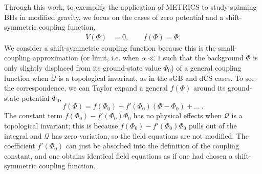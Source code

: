 \documentclass[aps,prx,amsmath,floats,floatfix,twocolumn,
  superscriptaddress,nofootinbib,showpacs]{revtex4-1}
\begin{document}
Through this work, to exemplify the application of METRICS to study spinning BHs in modified gravity, we focus on the cases of zero potential and a shift-symmetric coupling function, 
\begin{equation}\label{eq:shift-symmetric}
\begin{split}
V(\Phi) &= 0, \qquad
f(\Phi) = \Phi. 
\end{split}
\end{equation}
We consider a shift-symmetric coupling function because this is the small-coupling approximation (or limit, i.e. when $\alpha \ll 1 $ such that the background $\Phi$ is only slightly displaced from its ground-state value $\Phi_0$) of a general coupling function when $\mathscr{Q}$ is a topological invariant, as in the sGB and dCS cases.  
To see the correspondence, we can Taylor expand a general $f(\Phi)$ around its ground-state potential $\Phi_0$,
\begin{equation}
f(\Phi) = f(\Phi_0) + f'(\Phi_0) (\Phi - \Phi_0) + ... ~ .  
\end{equation}
The constant term $f(\Phi_0) - f'(\Phi_0) \Phi_0 $ has no physical effects when $\mathscr{Q}$ is a topological invariant; this is because $f(\Phi_0) - f'(\Phi_0) \Phi_0 $ pulls out of the integral and $\mathscr{Q}$ has zero variation, so the field equations are not modified. The coefficient $f'(\Phi_0)$ can just be absorbed into the definition of the coupling constant, and one obtains identical field equations as if one had chosen a shift-symmetric coupling function. 
\end{document}
